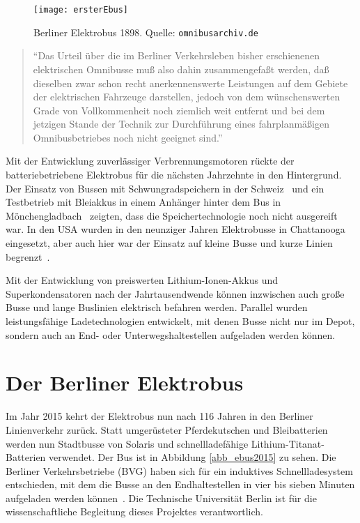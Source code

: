 \begin{figure}\centering
	\texttt{[image: ersterEbus]}
	\caption[Berliner Elektrobus 1898]{Berliner Elektrobus 1898. Quelle: \texttt{omnibusarchiv.de}}
	\label{abb_ersterEbus}
\end{figure}

\begin{quote}
	"`Das Urteil über die im Berliner Verkehrsleben bisher erschienenen elektrischen Omnibusse muß also dahin zusammengefaßt werden, daß dieselben zwar schon recht anerkennenswerte Leistungen auf dem Gebiete der elektrischen Fahrzeuge darstellen, jedoch von dem wünschenswerten Grade von Vollkommenheit noch ziemlich weit entfernt und bei dem jetzigen Stande der Technik zur Durchführung eines fahrplanmäßigen Omnibusbetriebes noch nicht geeignet sind."'~\cite{ersterEbus}
\end{quote}

Mit der Entwicklung zuverlässiger Verbrennungsmotoren rückte der batteriebetriebene Elektrobus für die nächsten Jahrzehnte in den Hintergrund. Der Einsatz von Bussen mit Schwungradspeichern in der Schweiz~\cite[S. 216]{tub_aleph001746639} und ein Testbetrieb mit Bleiakkus in einem Anhänger hinter dem Bus in Mönchengladbach~\cite[S. 170]{tub_aleph001746639} zeigten, dass die Speichertechnologie noch nicht ausgereift war. In den USA wurden in den neunziger Jahren Elektrobusse in Chattanooga eingesetzt, aber auch hier war der Einsatz auf kleine Busse und kurze Linien begrenzt~\cite{chattanoogaDOE}.

Mit der Entwicklung von preiswerten Lithium-Ionen-Akkus und Superkondensatoren nach der Jahrtausendwende können inzwischen auch große Busse und lange Buslinien elektrisch befahren werden. Parallel wurden leistungsfähige Ladetechnologien entwickelt, mit denen Busse nicht nur im Depot, sondern auch an End- oder Unterwegshaltestellen aufgeladen werden können.

\section{Der Berliner Elektrobus}
Im Jahr 2015 kehrt der Elektrobus nun nach 116 Jahren in den Berliner Linienverkehr zurück. Statt umgerüsteter Pferdekutschen und Bleibatterien werden nun Stadtbusse von Solaris und schnellladefähige Lithium-Titanat-Batterien verwendet. Der Bus ist in Abbildung \ref{abb_ebus2015} zu sehen. Die Berliner Verkehrsbetriebe (BVG) haben sich für ein induktives Schnellladesystem entschieden, mit dem die Busse an den Endhaltestellen in vier bis sieben Minuten aufgeladen werden können~\cite{ebus2015}. Die Technische Universität Berlin ist für die wissenschaftliche Begleitung dieses Projektes verantwortlich.

